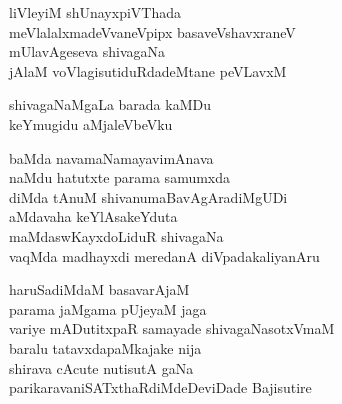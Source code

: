 \begin{entry}
\begin{shl}
liVleyiM shUnayxpiVThada\\
meVlalalxmadeVvaneVpipx basaveVshavxraneV\\
mUlavAgeseva shivagaNa\\
jAlaM voVlagisutiduRdadeMtane peVLavxM
\end{shl}
\begin{shl}
shivagaNaMgaLa barada kaMDu\\
keYmugidu aMjaleVbeVku
\end{shl}
\end{entry}

\begin{entry}
\gl{}
\end{entry}

\begin{entry}
\gl{}
\begin{shl}
baMda navamaNamayavimAnava\\
naMdu hatutxte parama samumxda\\
diMda tAnuM shivanumaBavAgAradiMgUDi\\
aMdavaha keYlAsakeYduta\\
maMdaswKayxdoLiduR shivagaNa\\
vaqMda madhayxdi meredanA diVpadakaliyanAru
\end{shl}
\end{entry}

\begin{entry}
\gl{}
\begin{shl}
haruSadiMdaM basavarAjaM\\
parama jaMgama pUjeyaM jaga\\
variye mADutitxpaR samayade shivagaNasotxVmaM\\
baralu tatavxdapaMkajake nija\\
shirava cAcute nutisutA gaNa\\
parikaravaniSATxthaRdiMdeDeviDade Bajisutire
\end{shl}
\end{entry}

